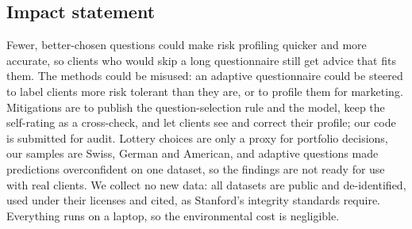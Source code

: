 \subsection*{Impact statement}
Fewer, better-chosen questions could make risk profiling quicker and more accurate, so clients who would skip a long questionnaire still get advice that fits them. The methods could be misused: an adaptive questionnaire could be steered to label clients more risk tolerant than they are, or to profile them for marketing. Mitigations are to publish the question-selection rule and the model, keep the self-rating as a cross-check, and let clients see and correct their profile; our code is submitted for audit. Lottery choices are only a proxy for portfolio decisions, our samples are Swiss, German and American, and adaptive questions made predictions overconfident on one dataset, so the findings are not ready for use with real clients. We collect no new data: all datasets are public and de-identified, used under their licenses and cited, as Stanford's integrity standards require. Everything runs on a laptop, so the environmental cost is negligible.

